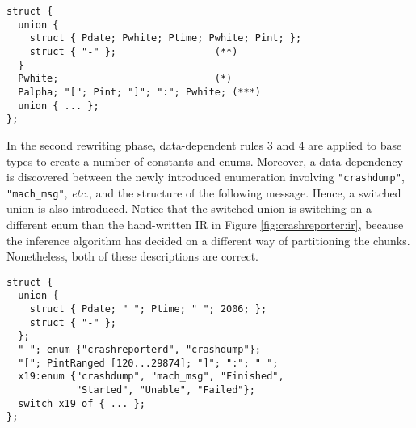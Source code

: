 {\small
\begin{verbatim}
struct {
  union {
    struct { Pdate; Pwhite; Ptime; Pwhite; Pint; };
    struct { "-" };                 (**)
  }
  Pwhite;                           (*)
  Palpha; "["; Pint; "]"; ":"; Pwhite; (***)
  union { ... };
};
\end{verbatim}
}


In the second rewriting phase, 
data-dependent rules 3 and 4 are applied to base types to 
create a number of constants and enums.
Moreover, a data dependency is discovered between the
newly introduced enumeration involving {\tt "crashdump"},
{\tt "mach\_msg"}, {\em etc.}, and the structure of the following message.
Hence, a switched union is also introduced.
Notice that the switched union is switching on a different enum 
than the hand-written IR in Figure \ref{fig:crashreporter:ir}, because
the inference algorithm has decided on a different way of partitioning
the chunks. Nonetheless, both of these descriptions are
correct.


{\small
\begin{verbatim}
struct {
  union {
    struct { Pdate; " "; Ptime; " "; 2006; };
    struct { "-" };
  };
  " "; enum {"crashreporterd", "crashdump"};
  "["; PintRanged [120...29874]; "]"; ":"; " ";
  x19:enum {"crashdump", "mach_msg", "Finished", 
            "Started", "Unable", "Failed"};
  switch x19 of { ... };
};
\end{verbatim}
}



